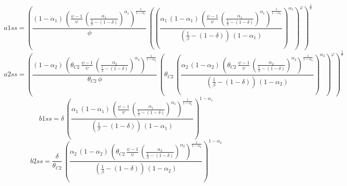 \begin{dmath*}
a1ss = \left(\frac{\left(1-{{\alpha_{1}}}\right)\, \left(\frac{{{\psi}}-1}{{{\psi}}}\, \left(\frac{{{\alpha_{1}}}}{\frac{1}{{{\beta}}}-\left(1-{{\delta}}\right)}\right)^{{{\alpha_{1}}}}\right)^{\frac{1}{1-{{\alpha_{1}}}}}}{{{\phi}}}\, \left(\left(\frac{{{\alpha_{1}}}\, \left(1-{{\alpha_{1}}}\right)\, \left(\frac{{{\psi}}-1}{{{\psi}}}\, \left(\frac{{{\alpha_{1}}}}{\frac{1}{{{\beta}}}-\left(1-{{\delta}}\right)}\right)^{{{\alpha_{1}}}}\right)^{\frac{1}{1-{{\alpha_{1}}}}}}{\left(\frac{1}{{{\beta}}}-\left(1-{{\delta}}\right)\right)\, \left(1-{{\alpha_{1}}}\right)}\right)^{{{\alpha_{1}}}}\right)^{{{\varphi}}}\right)^{\frac{1}{{{\sigma}}}}
\end{dmath*}
\begin{dmath*}
a2ss = \left(\frac{\left(1-{{\alpha_{2}}}\right)\, \left({{\theta_{C2}}}\, \frac{{{\psi}}-1}{{{\psi}}}\, \left(\frac{{{\alpha_{2}}}}{\frac{1}{{{\beta}}}-\left(1-{{\delta}}\right)}\right)^{{{\alpha_{2}}}}\right)^{\frac{1}{1-{{\alpha_{2}}}}}}{{{\theta_{C2}}}\, {{\phi}}}\, \left({{\theta_{C2}}}\, \left(\frac{{{\alpha_{2}}}\, \left(1-{{\alpha_{2}}}\right)\, \left({{\theta_{C2}}}\, \frac{{{\psi}}-1}{{{\psi}}}\, \left(\frac{{{\alpha_{2}}}}{\frac{1}{{{\beta}}}-\left(1-{{\delta}}\right)}\right)^{{{\alpha_{2}}}}\right)^{\frac{1}{1-{{\alpha_{2}}}}}}{\left(\frac{1}{{{\beta}}}-\left(1-{{\delta}}\right)\right)\, \left(1-{{\alpha_{2}}}\right)}\right)^{{{\alpha_{2}}}}\right)^{{{\varphi}}}\right)^{\frac{1}{{{\sigma}}}}
\end{dmath*}
\begin{dmath*}
b1ss = {{\delta}}\, \left(\frac{{{\alpha_{1}}}\, \left(1-{{\alpha_{1}}}\right)\, \left(\frac{{{\psi}}-1}{{{\psi}}}\, \left(\frac{{{\alpha_{1}}}}{\frac{1}{{{\beta}}}-\left(1-{{\delta}}\right)}\right)^{{{\alpha_{1}}}}\right)^{\frac{1}{1-{{\alpha_{1}}}}}}{\left(\frac{1}{{{\beta}}}-\left(1-{{\delta}}\right)\right)\, \left(1-{{\alpha_{1}}}\right)}\right)^{1-{{\alpha_{1}}}}
\end{dmath*}
\begin{dmath*}
b2ss = \frac{{{\delta}}}{{{\theta_{C2}}}}\, \left(\frac{{{\alpha_{2}}}\, \left(1-{{\alpha_{2}}}\right)\, \left({{\theta_{C2}}}\, \frac{{{\psi}}-1}{{{\psi}}}\, \left(\frac{{{\alpha_{2}}}}{\frac{1}{{{\beta}}}-\left(1-{{\delta}}\right)}\right)^{{{\alpha_{2}}}}\right)^{\frac{1}{1-{{\alpha_{2}}}}}}{\left(\frac{1}{{{\beta}}}-\left(1-{{\delta}}\right)\right)\, \left(1-{{\alpha_{2}}}\right)}\right)^{1-{{\alpha_{2}}}}
\end{dmath*}
